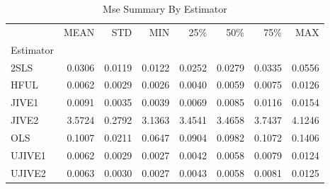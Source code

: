 \begin{table}[ht]
\centering
\caption{Mse Summary By Estimator}
\begin{tabular}{lrrrrrrr}
\toprule
 & MEAN & STD & MIN & 25\% & 50\% & 75\% & MAX \\
Estimator &  &  &  &  &  &  &  \\
\midrule
2SLS & 0.0306 & 0.0119 & 0.0122 & 0.0252 & 0.0279 & 0.0335 & 0.0556 \\
HFUL & 0.0062 & 0.0029 & 0.0026 & 0.0040 & 0.0059 & 0.0075 & 0.0126 \\
JIVE1 & 0.0091 & 0.0035 & 0.0039 & 0.0069 & 0.0085 & 0.0116 & 0.0154 \\
JIVE2 & 3.5724 & 0.2792 & 3.1363 & 3.4541 & 3.4658 & 3.7437 & 4.1246 \\
OLS & 0.1007 & 0.0211 & 0.0647 & 0.0904 & 0.0982 & 0.1072 & 0.1406 \\
UJIVE1 & 0.0062 & 0.0029 & 0.0027 & 0.0042 & 0.0058 & 0.0079 & 0.0124 \\
UJIVE2 & 0.0063 & 0.0030 & 0.0027 & 0.0043 & 0.0058 & 0.0081 & 0.0125 \\
\bottomrule
\end{tabular}
\end{table}
